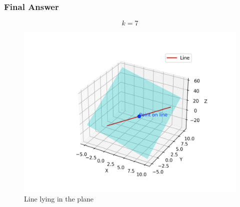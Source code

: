 \documentclass{beamer}
\begin{document}
\begin{frame}
\frametitle{Final Answer}
\[
\boxed{k = 7}
\]

\begin{figure}[h!]
    \centering
    \includegraphics[width=0.65\linewidth]{figs/fig.png}
    \caption{Line lying in the plane}
\end{figure}
\end{frame}
\end{document}
